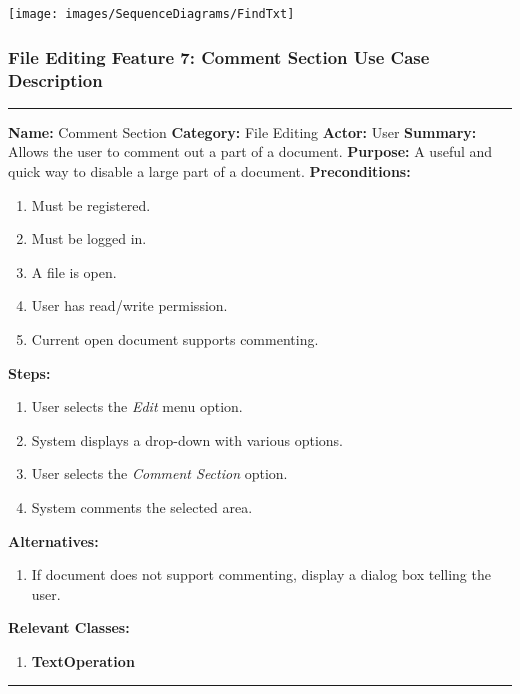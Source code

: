 \documentclass[twoside,letterpaper]{article}
\begin{document}
\bigskip

\texttt{[image: images/SequenceDiagrams/FindTxt]}

\newpage

\subsubsection[File Editing Feature 7: Comment Section]{\rmfamily\bfseries\color{black}
	File Editing Feature 7: Comment Section Use Case Description}
\hypertarget{RefHeading22059017292}{}

\vspace{2pt}
\hrule
\vspace{8pt}
	\noindent\textbf{Name:} Comment Section \newline
	\noindent\textbf{Category:} File Editing \newline
	\noindent\textbf{Actor:} User \newline
	\noindent\textbf{Summary:} Allows the user to comment out a part of a document. \newline
	\noindent\textbf{Purpose:} A useful and quick way to disable a large part of a document. \newline
	\noindent\textbf{Preconditions:}
	\begin{enumerate}
		\item Must be registered.
		\item Must be logged in.
		\item A file is open.
		\item User has read/write permission.
		\item Current open document supports commenting.
	\end{enumerate}
	\noindent\textbf{Steps:}
	\begin{enumerate}
		\item User selects the \textit{Edit} menu option.
		\item System displays a drop-down with various options.
		\item User selects the \textit{Comment Section} option.
		\item System comments the selected area.
	\end{enumerate}
	\noindent\textbf{Alternatives:}
	\begin{enumerate}
		\item If document does not support commenting, display a dialog box telling the user.
	\end{enumerate}
	\noindent\textbf{Relevant Classes:}
	\begin{enumerate}
		\item \textbf {TextOperation}
	\end{enumerate}
\vspace{8pt}
\hrule
\newpage
\end{document}
